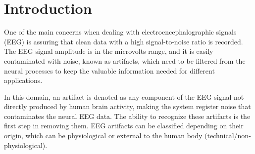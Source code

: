 \documentclass[runningheads]{llncs}
\begin{document}
\section{Introduction}

One of the main concerns when dealing with electroencephalographic
signals (EEG) is assuring that clean data with a high signal-to-noise
ratio is recorded. The EEG signal amplitude is in the microvolts
range, and it is easily contaminated with noise, known as artifacts,
which need to be filtered from the neural processes to keep the
valuable information needed for different applications.

In this domain, an artifact is denoted as any component of the EEG
signal not directly produced by human brain activity, making the
system register noise that contaminates the neural EEG data. The
ability to recognize these artifacts is the first step in removing
them. EEG artifacts can be classified depending on their origin, which
can be physiological or external to the human body
(technical/non-physiological).
\end{document}
